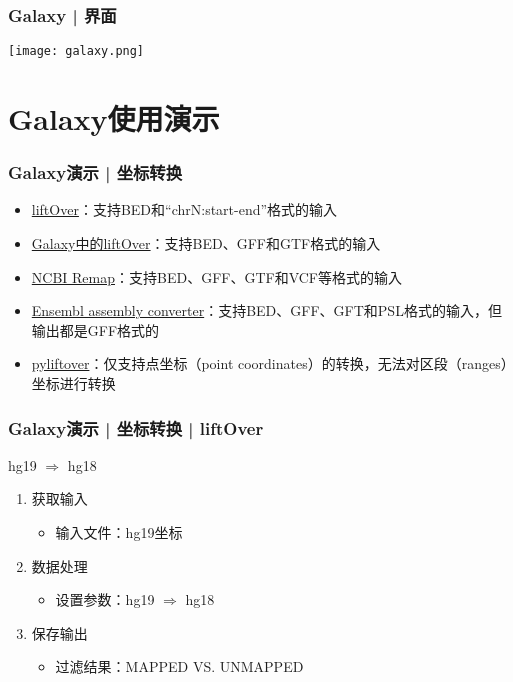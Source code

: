 \begin{frame}
  \frametitle{Galaxy | 界面}
  \begin{center}
    \texttt{[image: galaxy.png]}
  \end{center}
\end{frame}

\section{Galaxy使用演示}
\begin{frame}
  \frametitle{Galaxy演示 | \alert{坐标转换}}
  \begin{itemize}
    \item \href{http://genome.ucsc.edu/cgi-bin/hgLiftOver}{liftOver}：支持BED和“chrN:start-end”格式的输入
    \item \href{https://usegalaxy.org/}{Galaxy中的liftOver}：支持BED、GFF和GTF格式的输入
    \item \href{http://www.ncbi.nlm.nih.gov/genome/tools/remap}{NCBI Remap}：支持BED、GFF、GTF和VCF等格式的输入
    \item \href{http://asia.ensembl.org/Homo\_sapiens/UserData/SelectFeatures}{Ensembl assembly converter}：支持BED、GFF、GFT和PSL格式的输入，但输出都是GFF格式的
    \item \href{https://pypi.python.org/pypi/pyliftover}{pyliftover}：仅支持点坐标（point coordinates）的转换，无法对区段（ranges）坐标进行转换
  \end{itemize}
\end{frame}

\begin{frame}
  \frametitle{Galaxy演示 | 坐标转换 | liftOver}
  \begin{block}{hg19 $\Rightarrow$ hg18}
    \pause
  \begin{enumerate}[<+-|alert@+>]
    \item 获取输入
      \begin{itemize}
        \item 输入文件：hg19坐标
      \end{itemize}
    \item 数据处理
      \begin{itemize}
        \item 设置参数：hg19 $\Rightarrow$ hg18
      \end{itemize}
    \item 保存输出
      \begin{itemize}
        \item 过滤结果：MAPPED VS. UNMAPPED
      \end{itemize}
  \end{enumerate}
\end{block}
\end{frame}

